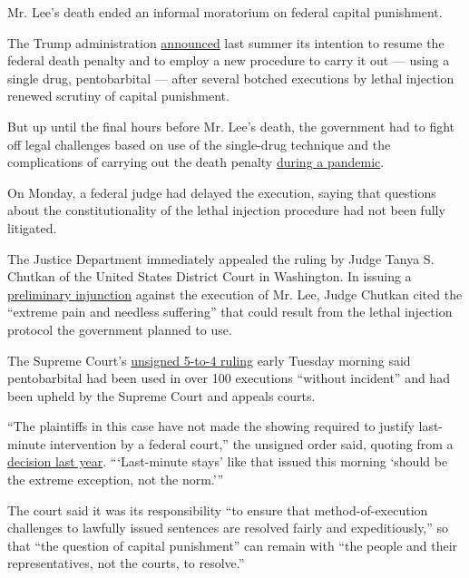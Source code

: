Mr. Lee's death ended an informal moratorium on federal capital
punishment.

The Trump administration
\href{https://www.justice.gov/opa/pr/executions-scheduled-four-federal-inmates-convicted-murdering-children}{announced}
last summer its intention to resume the federal death penalty and to
employ a new procedure to carry it out --- using a single drug,
pentobarbital --- after several botched executions by lethal injection
renewed scrutiny of capital punishment.

But up until the final hours before Mr. Lee's death, the government had
to fight off legal challenges based on use of the single-drug technique
and the complications of carrying out the death penalty
\href{https://www.nytimes.com/2020/06/30/us/politics/federal-executions-pandemic.html}{during
a pandemic}.

On Monday, a federal judge had delayed the execution, saying that
questions about the constitutionality of the lethal injection procedure
had not been fully litigated.

The Justice Department immediately appealed the ruling by Judge Tanya S.
Chutkan of the United States District Court in Washington. In issuing a
\href{https://ecf.dcd.uscourts.gov/cgi-bin/show_public_doc?2019mc0145-135}{preliminary
injunction} against the execution of Mr. Lee, Judge Chutkan cited the
``extreme pain and needless suffering'' that could result from the
lethal injection protocol the government planned to use.

The Supreme Court's
\href{https://www.supremecourt.gov/opinions/19pdf/20a8_970e.pdf}{unsigned
5-to-4 ruling} early Tuesday morning said pentobarbital had been used in
over 100 executions ``without incident'' and had been upheld by the
Supreme Court and appeals courts.

``The plaintiffs in this case have not made the showing required to
justify last-minute intervention by a federal court,'' the unsigned
order said, quoting from a
\href{https://www.supremecourt.gov/opinions/18pdf/17-8151_1qm2.pdf}{decision
last year}. ```Last-minute stays' like that issued this morning `should
be the extreme exception, not the norm.'''

The court said it was its responsibility ``to ensure that
method-of-execution challenges to lawfully issued sentences are resolved
fairly and expeditiously,'' so that ``the question of capital
punishment'' can remain with ``the people and their representatives, not
the courts, to resolve.''

